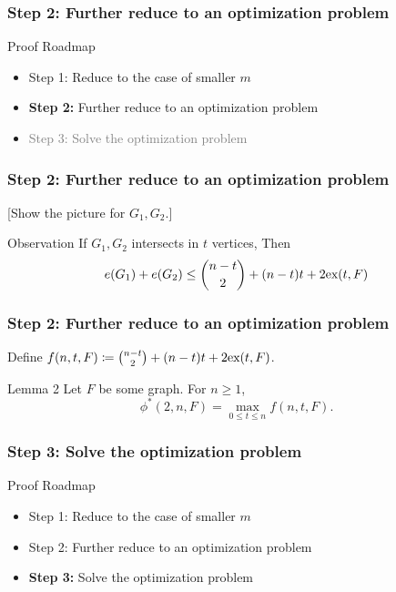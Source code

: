 \documentclass{beamer}
\newcommand*{\ex}{\textnormal{ex}}
\begin{document}
\begin{frame}
  \frametitle{Step 2: Further reduce to an optimization problem}

  Proof Roadmap

  \begin{itemize}
    \item Step 1: Reduce to the case of smaller $m$
    \item \textbf{Step 2:} Further reduce to an optimization problem
    \item \textcolor{gray}{Step 3: Solve the optimization problem}
  \end{itemize}
\end{frame}

\begin{frame}
  \frametitle{Step 2: Further reduce to an optimization problem}

  [Show the picture for $G_1, G_2$.]

  \pause

  \begin{block}{Observation}
    If $G_1, G_2$ intersects in $t$ vertices, Then
    \[
      e(G_1) + e(G_2) \leq \binom{n - t}{2} + (n - t)t + 2\ex(t, F)
    \]
  \end{block}
\end{frame}

\begin{frame}
  \frametitle{Step 2: Further reduce to an optimization problem}

  Define $f(n, t, F) \coloneq \binom{n - t}{2} + (n - t)t + 2\ex(t, F)$.

  \begin{block}{Lemma 2}
    Let $F$ be some graph. For $n \geq 1$,
    \[
      \phi^*(2, n, F) = \max_{0 \leq t \leq n} f(n, t, F).
    \]
  \end{block}
\end{frame}

\begin{frame}
  \frametitle{Step 3: Solve the optimization problem}

  Proof Roadmap

  \begin{itemize}
    \item Step 1: Reduce to the case of smaller $m$
    \item Step 2: Further reduce to an optimization problem
    \item \textbf{Step 3:} Solve the optimization problem
  \end{itemize}
\end{frame}
\end{document}
